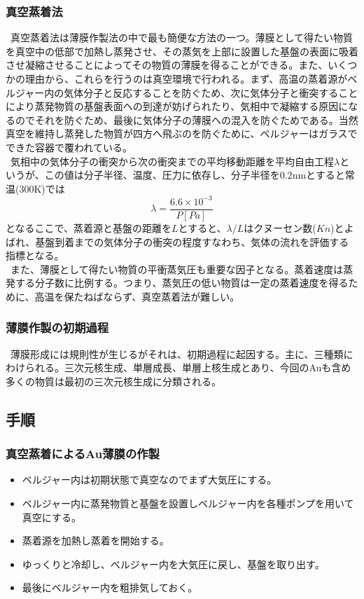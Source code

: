 \documentclass{jsarticle}
\begin{document}
\subsubsection{真空蒸着法}
\ 真空蒸着法は薄膜作製法の中で最も簡便な方法の一つ。薄膜として得たい物質を真空中の低部で加熱し蒸発させ、その蒸気を上部に設置した基盤の表面に吸着させ凝縮させることによってその物質の薄膜を得ることができる。また、いくつかの理由から、これらを行うのは真空環境で行われる。まず、高温の蒸着源がベルジャー内の気体分子と反応することを防ぐため、次に気体分子と衝突することにより蒸発物質の基盤表面への到達が妨げられたり、気相中で凝縮する原因になるのでそれを防ぐため、最後に気体分子の薄膜への混入を防ぐためである。当然真空を維持し蒸発した物質が四方へ飛ぶのを防ぐために、ベルジャーはガラスでできた容器で覆われている。\\
\ 気相中の気体分子の衝突から次の衝突までの平均移動距離を平均自由工程$\lambda$というが、この値は分子半径、温度、圧力に依存し、分子半径を$0.2$nmとすると常温($300$K)では
$$
\lambda=\frac{6.6\times 10^{-3}}{P[Pa]}
$$
となるここで、蒸着源と基盤の距離を$L$とすると、$\lambda / L$はクヌーセン数($Kn$)とよばれ、基盤到着までの気体分子の衝突の程度すなわち、気体の流れを評価する指標となる。\\
\ また、薄膜として得たい物質の平衝蒸気圧も重要な因子となる。蒸着速度は蒸発する分子数に比例する。つまり、蒸気圧の低い物質は一定の蒸着速度を得るために、高温を保たねばならず、真空蒸着法が難しい。
\subsubsection{薄膜作製の初期過程}
\ 薄膜形成には規則性が生じるがそれは、初期過程に起因する。主に、三種類にわけられる。三次元核生成、単層成長、単層上核生成とあり、今回のAuも含め多くの物質は最初の三次元核生成に分類される。
\subsection{手順}
\subsubsection{真空蒸着によるAu薄膜の作製}
\begin{itemize}
\item ベルジャー内は初期状態で真空なのでまず大気圧にする。
\item ベルジャー内に蒸発物質と基盤を設置しベルジャー内を各種ポンプを用いて真空にする。
\item 蒸着源を加熱し蒸着を開始する。
\item ゆっくりと冷却し、ベルジャー内を大気圧に戻し、基盤を取り出す。
\item 最後にベルジャー内を粗排気しておく。
\end{itemize}
\end{document}
